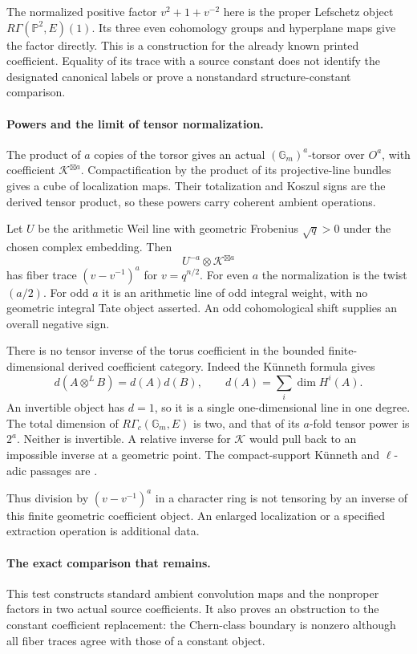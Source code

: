 \documentclass[11pt,a4paper]{article}
\theoremstyle{named}\newtheorem{finding}{Finding}[section]
\theoremstyle{definition}\newtheorem{definition}[finding]{Definition}
\theoremstyle{remark}\newtheorem{remark}[finding]{Remark}
\begin{document}
The normalized positive factor \(v^2+1+v^{-2}\) here is
the proper Lefschetz object
\(R\Gamma(\mathbb P^2,E)(1)\).
Its three even cohomology groups and hyperplane maps give
the factor directly. This is a construction for the already
known printed coefficient. Equality of its trace with a
source constant does not identify the designated canonical
labels or prove a nonstandard structure-constant comparison.

\paragraph{Powers and the limit of tensor normalization.}
The product of \(a\) copies of the torsor gives an actual
\((\mathbb G_m)^a\)-torsor over \(O^a\), with coefficient
\(\mathcal K^{\boxtimes a}\).
Compactification by the product of its projective-line
bundles gives a cube of localization maps. Their totalization
and Koszul signs are the derived tensor product, so these
powers carry coherent ambient operations.

Let \(U\) be the arithmetic Weil line with geometric
Frobenius \(\sqrt q>0\) under the chosen complex embedding.
Then
\[
                   U^{-a}\otimes\mathcal K^{\boxtimes a}
\]
has fiber trace \((v-v^{-1})^a\) for \(v=q^{n/2}\).
For even \(a\) the normalization is the twist \((a/2)\).
For odd \(a\) it is an arithmetic line of odd integral weight,
with no geometric integral Tate object asserted.
An odd cohomological shift supplies an overall negative sign.

There is no tensor inverse of the torus coefficient in the
bounded finite-dimensional derived coefficient category.
Indeed the K\"unneth formula gives
\[
 d(A\otimes^L B)=d(A)d(B),\qquad
 d(A)=\sum_i\dim H^i(A).
\]
An invertible object has \(d=1\), so it is a single
one-dimensional line in one degree.
The total dimension of \(R\Gamma_c(\mathbb G_m,E)\) is two,
and that of its \(a\)-fold tensor power is \(2^a\).
Neither is invertible. A relative inverse for \(\mathcal K\)
would pull back to an impossible inverse at a geometric point.
The compact-support K\"unneth and \(\ell\)-adic passages are
\cite[Theorem~22.1 and Remark~22.3(b)--(d),
pp.~135--136]{Milne}.

Thus division by \((v-v^{-1})^a\) in a character ring is
not tensoring by an inverse of this finite geometric
coefficient object. An enlarged localization or a specified
extraction operation is additional data.

\paragraph{The exact comparison that remains.}
This test constructs standard ambient convolution maps and
the nonproper factors in two actual source coefficients.
It also proves an obstruction to the constant coefficient
replacement: the Chern-class boundary is nonzero although
all fiber traces agree with those of a constant object.
\end{document}
